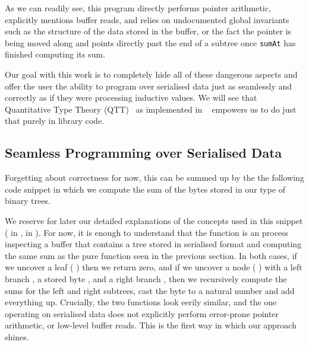 As we can readily see, this program
directly performs pointer arithmetic,
explicitly mentions buffer reads,
and relies on undocumented global invariants
such as the structure of the data stored in the buffer,
or the fact the pointer is being moved along and points directly past
the end of a subtree once \texttt{sumAt} has finished computing
its sum.

Our goal with this work is to completely hide all of these
dangerous aspects
and offer the user the ability to program over serialised data
just as seamlessly and correctly as
if they were processing inductive values.
%
We will see that
Quantitative Type Theory (QTT)~\cite{DBLP:conf/birthday/McBride16, DBLP:conf/lics/Atkey18}
as implemented in \idris{}~\cite{DBLP:conf/ecoop/Brady21}
empowers us to do just that purely in library code.

\subsection{Seamless Programming over Serialised Data}\label{sec:seamless}

Forgetting about correctness for now, this can be summed up by the
the following code snippet in which we compute the sum of the bytes
stored in our type of binary trees.


\begin{center}
  \begin{minipage}{.5\textwidth}
  \end{minipage}
\end{center}

We reserve for later our detailed explanations of the concepts
used in this snippet
( in ,
 in ).
%
For now, it is enough to understand that the function
is an  process
inspecting a buffer that contains a tree stored in serialised format
and computing the same sum as the pure function seen in the previous section.
%
In both cases, if we uncover a leaf
({ \IdrisData{\#}} \IdrisKeyword{\KatlaUnderscore{}})
then we return zero,
and if we uncover a node
({ \IdrisData{\#}}  \IdrisData{\#}  \IdrisData{\#} )
with
a left branch ,
a stored byte ,
and a right branch ,
then we recursively compute the sums for the left and right subtrees,
cast the byte to a natural number and add everything up.
%
Crucially, the two functions look eerily similar, and the one operating on
serialised data does not explicitly perform error-prone pointer arithmetic,
or low-level buffer reads.
%
This is the first way in which our approach shines.

